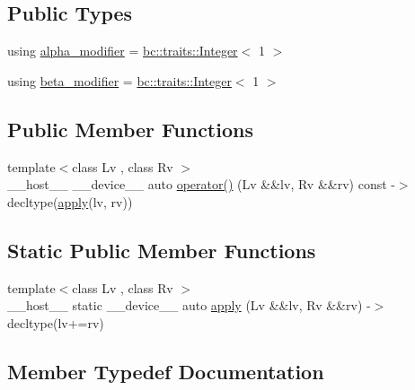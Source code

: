 \subsection*{Public Types}
\begin{DoxyCompactItemize}
\item 
using \hyperlink{structbc_1_1oper_1_1Add__Assign_a608f4b132e9a48c01de612acac5af87e}{alpha\+\_\+modifier} = \hyperlink{structbc_1_1traits_1_1Integer}{bc\+::traits\+::\+Integer}$<$ 1 $>$
\item 
using \hyperlink{structbc_1_1oper_1_1Add__Assign_a2ad8892dba37c039d7a82b674c126bf0}{beta\+\_\+modifier} = \hyperlink{structbc_1_1traits_1_1Integer}{bc\+::traits\+::\+Integer}$<$ 1 $>$
\end{DoxyCompactItemize}
\subsection*{Public Member Functions}
\begin{DoxyCompactItemize}
\item 
{\footnotesize template$<$class Lv , class Rv $>$ }\\\+\_\+\+\_\+host\+\_\+\+\_\+ \+\_\+\+\_\+device\+\_\+\+\_\+ auto \hyperlink{structbc_1_1oper_1_1Add__Assign_a40d7c53569de0b79f9548b16b21c0b09}{operator()} (Lv \&\&lv, Rv \&\&rv) const -\/$>$ decltype(\hyperlink{structbc_1_1oper_1_1Add__Assign_ac908f04769926c30ab8763d5748dee4b}{apply}(lv, rv))
\end{DoxyCompactItemize}
\subsection*{Static Public Member Functions}
\begin{DoxyCompactItemize}
\item 
{\footnotesize template$<$class Lv , class Rv $>$ }\\\+\_\+\+\_\+host\+\_\+\+\_\+ static \+\_\+\+\_\+device\+\_\+\+\_\+ auto \hyperlink{structbc_1_1oper_1_1Add__Assign_ac908f04769926c30ab8763d5748dee4b}{apply} (Lv \&\&lv, Rv \&\&rv) -\/$>$ decltype(lv+=rv)
\end{DoxyCompactItemize}


\subsection{Member Typedef Documentation}
\mbox{\label{structbc_1_1oper_1_1Add__Assign_a608f4b132e9a48c01de612acac5af87e}} 
